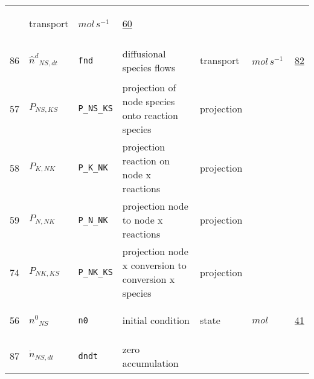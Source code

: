 \begin{longtable}{|p{1cm}|p{3cm}|p{5cm}|p{7.5cm}|p{3.0cm}|p{3cm}|p{1cm}|}
             & \begin{lay}transport \end{lay}
             & $ mol \,s^{-1} \, $
             & \hyperlink{"e:60"}{ 60 }
                 \\
    86
             & \hypertarget{"v:86"}{ $ {\hat{n}^{d}}_{{N S}, dt} $}
             & \verb|fnd|
             & diffusional species flows
             & \begin{lay}transport \end{lay}
             & $ mol \,s^{-1} \, $
             & \hyperlink{"e:82"}{ 82 }
                 \\
    57
             & \hypertarget{"v:57"}{ $ {P}_{{N S}, {K S}} $}
             & \verb|P_NS_KS|
             & projection of node species onto reaction species
             & \begin{lay}projection \end{lay}
             & $  $
             & \\
    58
             & \hypertarget{"v:58"}{ $ {P}_{K, {N K}} $}
             & \verb|P_K_NK|
             & projection reaction on node x reactions
             & \begin{lay}projection \end{lay}
             & $  $
             & \\
    59
             & \hypertarget{"v:59"}{ $ {P}_{N, {N K}} $}
             & \verb|P_N_NK|
             & projection node to node x reactions
             & \begin{lay}projection \end{lay}
             & $  $
             & \\
    74
             & \hypertarget{"v:74"}{ $ {P}_{{N K}, {K S}} $}
             & \verb|P_NK_KS|
             & projection node x conversion to conversion x species
             & \begin{lay}projection \end{lay}
             & $  $
             & \\
    56
             & \hypertarget{"v:56"}{ $ {n^{0}}_{{N S}} $}
             & \verb|n0|
             & initial condition
             & \begin{lay}state \end{lay}
             & $ mol \, $
             & \hyperlink{"e:41"}{ 41 }
                 \\
    87
             & \hypertarget{"v:87"}{ $ {\dot{n}}_{{N S}, dt} $}
             & \verb|dndt|
             & zero accumulation

\end{longtable}
